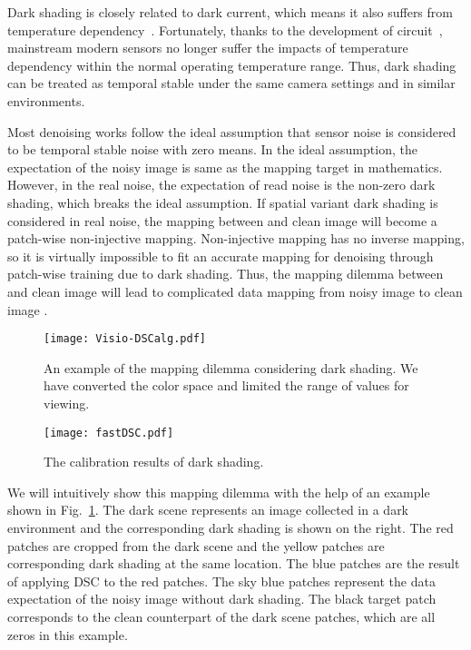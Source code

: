 \documentclass[sigconf,screen,nonacm]{acmart}
\begin{document}
    Dark shading is closely related to dark current, which means it also suffers from temperature dependency~\cite{2011/CMOS,EMVA1288}. Fortunately, thanks to the development of circuit~\cite{AICSP19/CDS,PRIME14/CDS}, mainstream modern sensors no longer suffer the impacts of temperature dependency within the normal operating temperature range. Thus, dark shading can be treated as temporal stable under the same camera settings and in similar environments.
    
    Most denoising works follow the ideal assumption that sensor noise is considered to be temporal stable noise with zero means.
    In the ideal assumption, the expectation of the noisy image  is same as the mapping target  in mathematics.
    However, in the real noise, the expectation of read noise  is the non-zero dark shading, which breaks the ideal assumption.
If spatial variant dark shading is considered in real noise, the mapping between  and clean image  will become a patch-wise non-injective mapping.
Non-injective mapping has no inverse mapping, so it is virtually impossible to fit an accurate mapping for denoising through patch-wise training due to dark shading. Thus, the mapping dilemma between  and clean image  will lead to complicated data mapping from noisy image  to clean image .

    \begin{figure}[t!]
        \texttt{[image: Visio-DSCalg.pdf]}
\caption{An example of the mapping dilemma considering dark shading. We have converted the color space and limited the range of values for viewing.}
        \label{fig:Mapping}
    \end{figure}
    
    \begin{figure}[t!]
\texttt{[image: fastDSC.pdf]}
        \caption{The calibration results of dark shading.}
        \label{fig:FastDSC}
    \end{figure}

    We will intuitively show this mapping dilemma with the help of an example shown in Fig.~\ref{fig:Mapping}.
    The dark scene represents an image collected in a dark environment and the corresponding dark shading is shown on the right.
    The red patches are cropped from the dark scene and the yellow patches are corresponding dark shading at the same location. The blue patches are the result of applying DSC to the red patches.
    The sky blue patches represent the data expectation of the noisy image without dark shading.
    The black target patch corresponds to the clean counterpart of the dark scene patches, which are all zeros in this example.
\end{document}
